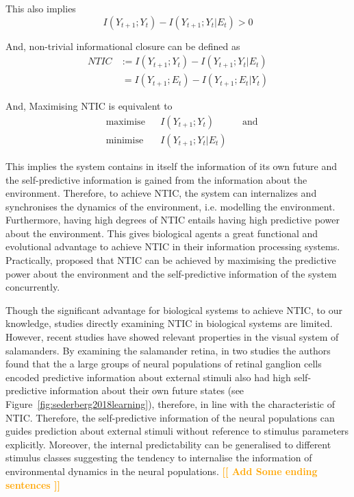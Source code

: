 \documentclass[utf8]{article}
\newcommand{\toWrite}[1]{\noindent
			\textcolor{Orange}{\textbf{[[ #1 ]]}}}
\begin{document}
			\noindent
			This also implies
				\begin{equation}
					I(Y_{t+1};Y_{t})-I(Y_{t+1};Y_{t}|E_{t}) > 0
				\end{equation}



			\noindent
			And, non-trivial informational closure can be defined as
				\begin{equation}
				\label{eq:NTIC}
    				\left.\begin{array}
    				{rl}{NTIC} & {:=I(Y_{t+1};Y_{t})-I(Y_{t+1};Y_{t}|E_{t})}\\
    				{ } & {\ =I(Y_{t+1};E_{t})-I(Y_{t+1};E_{t}|Y_{t})}
    				\end{array} \right.
				\end{equation}

			\noindent
			And, Maximising NTIC is equivalent to
				\begin{equation}
    				\label{eq:nticObjective}
    				\begin{aligned}
    				& \text{maximise} & { } & I(Y_{t+1};Y_{t}) & { } & \text{and} \\
    				& \text{minimise} & { } & I(Y_{t+1};Y_{t}|E_{t}) & { }
    				\end{aligned}
				\end{equation}

			\noindent
			This implies the system contains in itself the information of its own future and the self-predictive information is gained from the information about the environment. Therefore, to achieve NTIC, the system can internalizes and synchronises the dynamics of the environment, i.e. modelling the environment. Furthermore, having high degrees of NTIC entails having high predictive power about the environment. This gives biological agents a great functional and evolutional advantage to achieve NTIC in their information processing systems. Practically, \cite{guttenberg2016neural} proposed that NTIC can be achieved by maximising the predictive power about the environment and the self-predictive information of the system concurrently.


			Though the significant advantage for biological systems to achieve NTIC, to our knowledge, studies directly examining NTIC in biological systems are limited. However,  recent studies have showed relevant properties in the visual system of salamanders. By examining the salamander retina, in two studies \citep{Palmer2015, sederberg2018learning} the authors found that the a large groups of neural populations of retinal ganglion cells encoded predictive information about external stimuli also had high self-predictive information about their own future states (see Figure~\ref{fig:sederberg2018learning}), therefore, in line with the characteristic of NTIC. Therefore, the self-predictive information of the neural populations can guides prediction about external stimuli without reference to stimulus parameters explicitly. Moreover, the internal predictability can be generalised to different stimulus classes suggesting the tendency to internalise the information of environmental dynamics in the neural populations. \toWrite{Add Some ending sentences}
\end{document}
